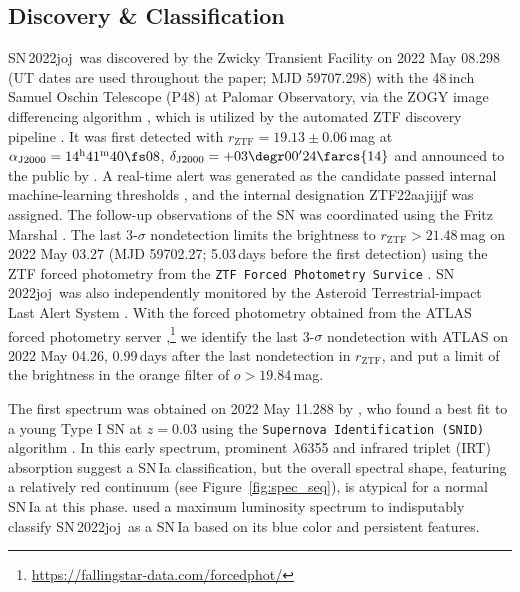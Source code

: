\documentclass[twocolumn]{aastex631}
\newcommand{\sn}{SN\,2022joj}
\begin{document}
\begin{CJK*}{UTF8}{gbsn}
\subsection{Discovery \& Classification}
\sn\ was discovered by the Zwicky Transient Facility \citep[ZTF;][]{Bellm_ZTF_2019a,Graham_ZTF_2019,Dekany_ZTF_2020} on 2022 May 08.298 (UT dates are used throughout the paper; MJD 59707.298) with the 48\,inch Samuel Oschin Telescope (P48) at Palomar Observatory, via the ZOGY image differencing algorithm \citep{Zackay_imagesub_2016}, which is utilized by the automated ZTF discovery pipeline \citep{Masci_ZTF_2019}. It was first detected with $r_\mathrm{ZTF}=19.13\pm0.06$\,mag at $\alpha_\mathrm{J2000}=14^\mathrm{h}41^\mathrm{m}40\fs08$, $\delta_\mathrm{J2000}=+03\degr00'24\farcs{14}$ and announced to the public by \citet{Fremling_2022TNSTR}. A real-time alert \citep{Patterson_ZTFalert_2019} was generated as the candidate passed internal machine-learning thresholds \citep[e.g.,][]{Duev_ZTFML_2019,Mahabal_ZTFML_2019}, and the internal designation ZTF22aajijjf was assigned. The follow-up observations of the SN was coordinated using the Fritz Marshal \citep{van_der_Walt_skyportal_2019,Coughlin_skyportal_2023}. The last 3-$\sigma$ nondetection limits the brightness to $r_\mathrm{ZTF}>21.48$\,mag on 2022 May 03.27 (MJD 59702.27; 5.03\,days before the first detection) using the ZTF forced photometry from the \texttt{ZTF Forced Photometry Survice} \citep[\texttt{ZFPS};][]{Masci_ZTFforced_2023}. \sn\ was also independently monitored by the Asteroid Terrestrial-impact Last Alert System \citep[ATLAS;][]{ATLAS_2018,ATLAS_2020}. With the forced photometry obtained from the ATLAS forced photometry server \citep{ATLAS_forced_phot_2021},\footnote{\url{https://fallingstar-data.com/forcedphot/}} we identify the last 3-$\sigma$ nondetection with ATLAS on 2022 May 04.26, 0.99\,days after the last nondetection in $r_\mathrm{ZTF}$, and put a limit of the brightness in the orange filter of $o>19.84$\,mag.

The first spectrum was obtained on 2022 May 11.288 by \citet{Newsome_2022TNSCR}, who found a best fit to a young Type I SN at $z=0.03$ using the \texttt{Supernova Identification (SNID)} algorithm \citep{Blondin_SNID_2007}. In this early spectrum, prominent  $\lambda$6355 and  infrared triplet (IRT) absorption suggest a SN\,Ia classification, but the overall spectral shape, featuring a relatively red continuum (see Figure~\ref{fig:spec_seq}), is atypical for a normal SN\,Ia at this phase. \citet{Chu_2022TNSCR} used a maximum luminosity spectrum to indisputably classify \sn\ as a SN\,Ia based on its blue color and persistent  features.


\end{CJK*}
\end{document}
